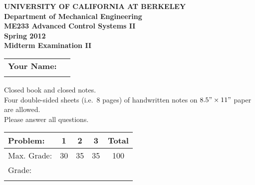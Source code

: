 \documentclass[letterpaper,12pt]{article}
\begin{document}
\begin{center}
    {\bf UNIVERSITY OF CALIFORNIA AT BERKELEY}\\
    {\bf Department of Mechanical Engineering}\\
    {\bf ME233  Advanced Control Systems II\\
    Spring 2012} \\ \vspace{2ex}
    {\Large \bf{ Midterm Examination II }}
\end{center}

\begin{tabular}{|l l|}
    \hline
    {\bf Your Name:} & \hspace{4in}$\:$\\
    $\:$ & $\:$\\
    \hline
\end{tabular}

$\:$\\

\noindent
Closed book and closed notes. \\
Four double-sided sheets (i.e.\ 8 pages) of handwritten notes on $8.5" \times 11"$ paper are allowed. \\
Please answer all questions.\\

\begin{tabular}{|l | c | c | c| c |  }
    \hline
    Problem: & 1 & 2 & 3 & Total \\ \hline
    Max. Grade: & 30 & 35 & 35 & 100 \\ \hline
    Grade: & \hspace{.5in} &\hspace{.5in} &\hspace{.5in}  &\hspace{.5in}  \\
    & & & & \\
    \hline
\end{tabular}



\newpage %

\newpage %

\end{document}
